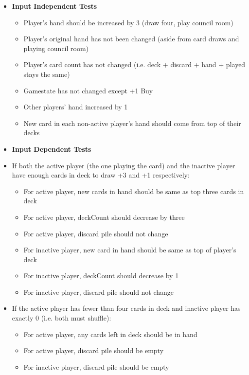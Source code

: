 \documentclass[11pt,letterpaper]{article}
\begin{document}
\begin{enumerate}[label=\Roman*.]
\begin{itemize}[leftmargin=*]
        \begin{itemize}[leftmargin=*, label={}]
          \item \textbf{Input Independent Tests}

            \begin{itemize}[leftmargin=*]
              \item Player's hand should be increased by 3 (draw four, play council room)
              \item Player's original hand has not been changed (aside from card draws and playing council room)
              \item Player's card count has not changed (i.e. deck + discard + hand + played stays the same)
              \item Gamestate has not changed except +1 Buy
              \item Other players' hand increased by 1
              \item New card in each non-active player's hand should come from top of their decks
            \end{itemize}

          \item \textbf{Input Dependent Tests}
          \item If both the active player (the one playing the card) and the inactive player have enough cards in deck to draw +3 and +1 respectively:
            \begin{itemize}[leftmargin=*]
              \item For active player, new cards in hand should be same as top three cards in deck
              \item For active player, deckCount should decrease by three
              \item For active player, discard pile should not change
              \item For inactive player, new card in hand should be same as top of player's deck
              \item For inactive player, deckCount should decrease by 1
              \item For inactive player, discard pile should not change
            \end{itemize}
          \item If the active player has fewer than four cards in deck and inactive player has exactly 0 (i.e. both must shuffle):
            \begin{itemize}[leftmargin=*]
              \item For active player, any cards left in deck should be in hand
              \item For active player, discard pile should be empty
              \item For inactive player, discard pile should be empty
            \end{itemize}
        \end{itemize}


\end{itemize}
\end{enumerate}
\end{document}
